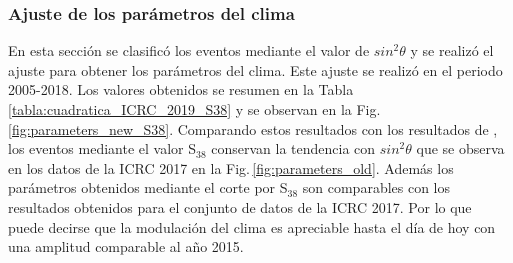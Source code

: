 \subsubsection{Ajuste de los parámetros del clima}

En esta sección se clasificó los eventos mediante el valor de $sin^2\theta$ y se realizó el ajuste para obtener los parámetros del clima. Este ajuste se realizó en el periodo 2005-2018. Los valores obtenidos se resumen en la Tabla\,\ref{tabla:cuadratica_ICRC_2019_S38} y se  observan en la Fig.\,\ref{fig:parameters_new_S38}. Comparando estos resultados con los resultados de \cite{aab2017impact}, los eventos mediante el valor S$_{38}$  conservan la tendencia con $sin^2\theta$ que se observa en los datos de la ICRC 2017 en la Fig.\,\ref{fig:parameters_old}. Además los parámetros obtenidos mediante el corte por S$_{38}$ son comparables con los resultados obtenidos para el conjunto de datos de la ICRC 2017. Por lo que puede decirse que la modulación del clima es apreciable  hasta el día de hoy con una amplitud comparable al año 2015.

